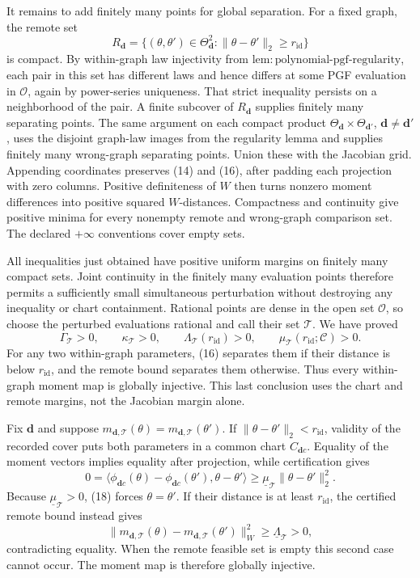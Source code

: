 It remains to add finitely many points for global separation.  For a fixed graph, the remote set
\[
 R_{\boldsymbol d}=\{(\theta,\theta')\in
 \Theta_{\boldsymbol d}^2:\|\theta-\theta'\|_2\geq r_{\mathrm{id}}\}
\]
is compact.  By within-graph law injectivity from \(\mathrm{lem{:}polynomial\text{-}pgf\text{-}regularity}\), each pair in this set has different laws and hence differs at some PGF evaluation in \(\mathcal O\), again by power-series uniqueness.  That strict inequality persists on a neighborhood of the pair.  A finite subcover of \(R_{\boldsymbol d}\) supplies finitely many separating points.  The same argument on each compact product \(\Theta_{\boldsymbol d}\times\Theta_{\boldsymbol d'}\), \(\boldsymbol d\ne\boldsymbol d'\), uses the disjoint graph-law images from the regularity lemma and supplies finitely many wrong-graph separating points.  Union these with the Jacobian grid.  Appending coordinates preserves (14) and (16), after padding each projection with zero columns.  Positive definiteness of \(W\) then turns nonzero moment differences into positive squared \(W\)-distances.  Compactness and continuity give positive minima for every nonempty remote and wrong-graph comparison set.  The declared \(+\infty\) conventions cover empty sets.

All inequalities just obtained have positive uniform margins on finitely many compact sets.  Joint continuity in the finitely many evaluation points therefore permits a sufficiently small simultaneous perturbation without destroying any inequality or chart containment.  Rational points are dense in the open set \(\mathcal O\), so choose the perturbed evaluations rational and call their set \(\mathcal T\).  We have proved
\[
 \Gamma_{\mathcal T}>0,
 \qquad \kappa_{\mathcal T}>0,
 \qquad \Lambda_{\mathcal T}(r_{\mathrm{id}})>0,
 \qquad \mu_{\mathcal T}(r_{\mathrm{id}};\mathscr C)>0. \tag{17}
\]
For any two within-graph parameters, (16) separates them if their distance is below \(r_{\mathrm{id}}\), and the remote bound separates them otherwise.  Thus every within-graph moment map is globally injective.  This last conclusion uses the chart and remote margins, not the Jacobian margin alone.

Fix \(\boldsymbol d\) and suppose
\(m_{\boldsymbol d,\mathcal T}(\theta)=m_{\boldsymbol d,\mathcal T}(\theta')\).  If \(\|\theta-\theta'\|_2<r_{\mathrm{id}}\), validity of the recorded cover puts both parameters in a common chart \(C_{\boldsymbol d c}\).  Equality of the moment vectors implies equality after projection, while certification gives
\[
 0=\langle\phi_{\boldsymbol d c}(\theta)-
 \phi_{\boldsymbol d c}(\theta'),\theta-\theta'\rangle
 \geq \underline\mu_{\mathcal T}\|\theta-\theta'\|_2^2. \tag{18}
\]
Because \(\underline\mu_{\mathcal T}>0\), (18) forces \(\theta=\theta'\).  If their distance is at least \(r_{\mathrm{id}}\), the certified remote bound instead gives
\[
 \|m_{\boldsymbol d,\mathcal T}(\theta)-
 m_{\boldsymbol d,\mathcal T}(\theta')\|_W^2
 \geq\underline\Lambda_{\mathcal T}>0, \tag{19}
\]
contradicting equality.  When the remote feasible set is empty this second case cannot occur.  The moment map is therefore globally injective.

